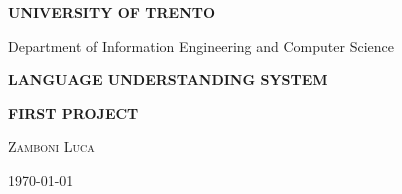 \begin{titlepage}
	\pagestyle{empty}

	\begin{center}
		{\bfseries\Large {\huge U}NIVERSITY OF {\huge T}RENTO}

		\vspace{0.2cm}

		{\large Department of Information Engineering and Computer Science}

		\vspace{5.5cm}

		{\Large \bfseries {{\huge L}ANGUAGE {\huge U}NDERSTANDING} {\huge S}YSTEM}

		\vspace{1.0cm}

		{\Large \bfseries {FIRST PROJECT}}

		\vspace{2.5cm}
		
		{\large \textsc{Zamboni Luca}}

		\vspace{1.0cm}
		
		{\today}

		\vfill

	\end{center}

\end{titlepage}
